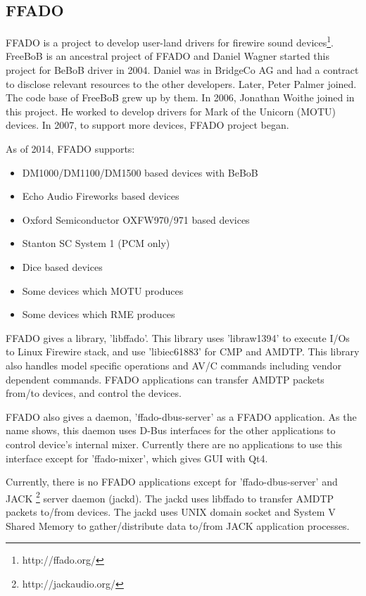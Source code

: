 \documentclass[onecolumn]{article}
\begin{document}
\subsection{FFADO}
FFADO is a project to develop user-land drivers for firewire sound devices\footnote{http://ffado.org/}. FreeBoB is an ancestral project of FFADO and Daniel Wagner started this project for BeBoB driver in 2004. Daniel was in BridgeCo AG and had a contract to disclose relevant resources to the other developers. Later, Peter Palmer joined. The code base of FreeBoB grew up by them. In 2006, Jonathan Woithe joined in this project. He worked to develop drivers for Mark of the Unicorn (MOTU) devices. In 2007, to support more devices, FFADO project began.

As of 2014, FFADO supports:
\begin{itemize}
\item DM1000/DM1100/DM1500 based devices with BeBoB
\item Echo Audio Fireworks based devices
\item Oxford Semiconductor OXFW970/971 based devices
\item Stanton SC System 1 (PCM only)
\item Dice based devices
\item Some devices which MOTU produces
\item Some devices which RME produces
\end{itemize}

FFADO gives a library, 'libffado'. This library uses 'libraw1394' to execute I/Os to Linux Firewire stack, and use 'libiec61883' for CMP and AMDTP. This library also handles model specific operations and AV/C commands including vendor dependent commands. FFADO applications can transfer AMDTP packets from/to devices, and control the devices.

FFADO also gives a daemon, 'ffado-dbus-server' as a FFADO application. As the name shows, this daemon uses D-Bus interfaces for the other applications to control device's internal mixer. Currently there are no applications to use this interface except for 'ffado-mixer', which gives GUI with Qt4.

Currently, there is no FFADO applications except for 'ffado-dbus-server' and JACK \footnote{http://jackaudio.org/} server daemon (jackd). The jackd uses libffado to transfer AMDTP packets to/from devices. The jackd uses UNIX domain socket and System V Shared Memory to gather/distribute data to/from JACK application processes. 
\end{document}
